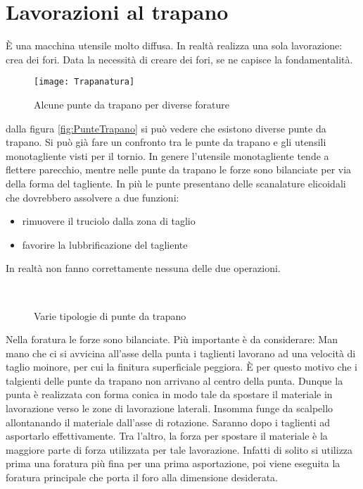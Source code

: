 \chapter{Lavorazioni al trapano}\label{chp:LavTrapano}
È una macchina utensile molto diffusa.
In realtà realizza una sola lavorazione: crea dei fori.
Data la necessità di creare dei fori, se ne capisce la fondamentalità.

\begin{figure}
\centering
\texttt{[image: Trapanatura]}
\caption{Alcune punte da trapano per diverse forature}
\label{fig:Tapanatura}
\end{figure}

dalla figura \ref{fig:PunteTrapano} si può vedere che esistono diverse punte da trapano.
Si può già fare un confronto tra le punte da trapano e gli utensili
monotagliente visti per il tornio.
In genere l'utensile monotagliente tende a flettere parecchio, mentre nelle punte da trapano 
le forze sono bilanciate per via della forma del tagliente.
In più le punte presentano delle scanalature elicoidali che dovrebbero assolvere
a due funzioni:
\begin{itemize}
\item rimuovere il truciolo dalla zona di taglio
\item favorire la lubbrificazione del tagliente
\end{itemize}
In realtà non fanno correttamente nessuna delle due operazioni.

\begin{figure}
\centering
{}\\
\quad
{}
\caption{Varie tipologie di punte da trapano}
\label{fig:Punte}
\end{figure}

Nella foratura le forze sono bilanciate. Più importante è da considerare:
Man mano che ci si avvicina all'asse della punta i taglienti lavorano ad una velocità di taglio
moinore, per cui la finitura superficiale peggiora.
È per questo motivo che i talgienti delle punte da trapano non arrivano al centro della punta.
Dunque la punta è realizzata con forma conica in modo tale da spostare il materiale in lavorazione 
verso le zone di lavorazione laterali. Insomma funge da scalpello allontanando il materiale
dall'asse di rotazione. Saranno dopo i taglienti ad asportarlo effettivamente. 
Tra l'altro, la forza per spostare il materiale è la maggiore parte di forza utilizzata per tale lavorazione.
Infatti di solito si utilizza prima una foratura più fina per una prima asportazione, poi viene 
eseguita la foratura principale che porta il foro alla dimensione desiderata.

